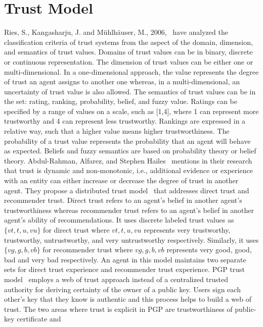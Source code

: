 \section{Trust Model}
Ries, S., Kangasharju, J. and Mühlhäuser, M.,
2006,~\cite{ries2006classification} have analyzed the classification criteria
of trust systems from the aspect of the domain, dimension, and semantics of
trust values. Domains of trust values can be in binary, discrete or continuous
representation. The dimension of trust values can be either one or
multi-dimensional. In a one-dimensional approach, the value represents the
degree of trust an agent assigns to another one whereas, in a
multi-dimensional, an uncertainty of trust value is also allowed. The semantics
of trust values can be in the set: rating, ranking, probability, belief, and
fuzzy value. Ratings can be specified by a range of values on a scale, such as
[1,4], where 1 can represent more trustworthy and 4 can represent less
trustworthy. Rankings are expressed in a relative way, such that a higher value
means higher trustworthiness. The probability of a trust value represents the
probability that an agent will behave as expected. Beliefs and fuzzy semantics
are based on probability theory or belief theory. Abdul-Rahman, Alfarez, and
Stephen Hailes~\cite{abdul2000supporting} mentions in their research that trust
is dynamic and non-monotonic, i.e., additional evidence or experience with an
entity can either increase or decrease the degree of trust in another agent.
They propose a distributed trust model~\cite{abdul1998distributed} that
addresses direct trust and recommender trust. Direct trust refers to an agent's
belief in another agent's trustworthiness whereas recommender trust refers to
an agent's belief in another agent's ability of recommendations. It uses
discrete labeled trust values as $\{vt, t, u, vu\}$ for direct trust where
$vt,t,u,vu$ represents very trustworthy, trustworthy, untrustworthy, and very
untrustworthy respectively. Similarly, it uses $\{vg, g, b, vb\}$ for
recommender trust where $vg, g, b, vb$ represents very good, good, bad and
very bad respectively. An agent in this model maintains two separate sets for
direct trust experience and recommender trust experience. PGP trust
model~\cite{abdul1997pgp} employs a web of trust approach instead of a
centralized trusted authority for deriving certainty of the owner of a public
key. Users sign each other's key that they know is authentic and this process
helps to build a web of trust. The two areas where
trust is explicit in PGP are trustworthiness of public-key certificate and
